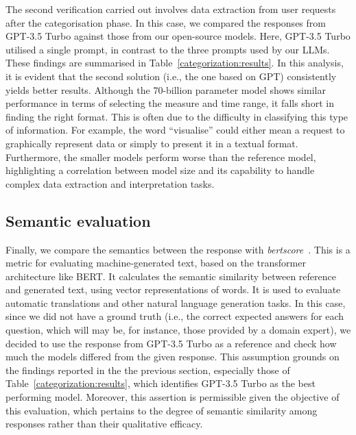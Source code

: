The second verification carried out involves data extraction from user requests after the categorisation phase. 
%
In this case, we compared the responses from GPT-3.5 Turbo against those from our open-source models.
%
Here, GPT-3.5 Turbo utilised a single prompt, in contrast to the three prompts used by our LLMs. These findings are summarised in Table~\ref{categorization:results}.
%
In this analysis, it is evident that the second solution (i.e., the one based on GPT) consistently yields better results. 
%
Although the 70-billion parameter model shows similar performance in terms of selecting the measure and time range, it falls short in finding the right format. 
%
This is often due to the difficulty in classifying this type of information.
%
For example, the word ``visualise'' could either mean a request to graphically represent data or simply to present it in a textual format.
%
Furthermore, the smaller models perform worse than the reference model, highlighting a correlation between model size and its capability to handle complex data extraction and interpretation tasks.


\subsection{Semantic evaluation}



Finally, we compare the semantics between the response with \emph{bertscore}~\cite{bert-score}.
%
This is a metric for evaluating machine-generated text, based on the transformer architecture like BERT. 
%
It calculates the semantic similarity between reference and generated text, using vector representations of words. 
%
It is used to evaluate automatic translations and other natural language generation tasks.
%
In this case, since we did not have a ground truth (i.e., the correct expected answers for each question, which will may be, for instance, those provided by a domain expert), we decided to use the response from GPT-3.5 Turbo as a reference and check how much the models differed from the given response.
%
This assumption grounds on the findings reported in the the previous section, especially those of Table~\ref{categorization:results}, which identifies GPT-3.5 Turbo as the best performing model.
%
Moreover, this assertion is permissible given the objective of this evaluation, which pertains to the degree of semantic similarity among responses rather than their qualitative efficacy.

